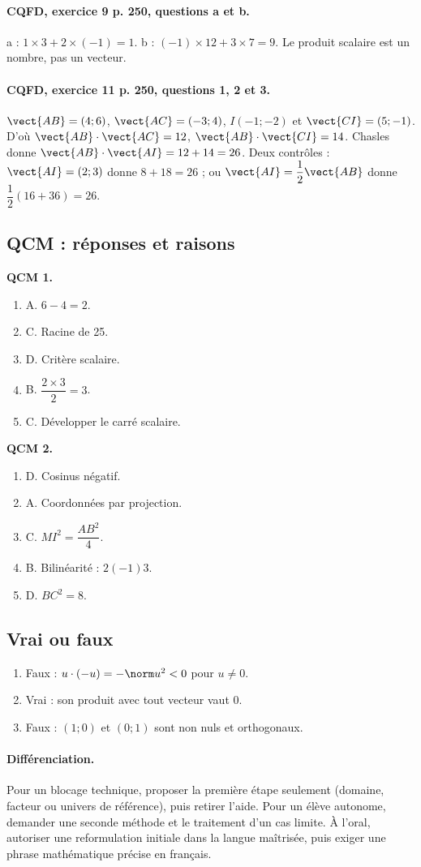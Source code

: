 \paragraph{CQFD, exercice 9 p. 250, questions a et b.} a : $1\times3+2\times(-1)=1$. b : $(-1)\times12+3\times7=9$. Le produit scalaire est un nombre, pas un vecteur.
\paragraph{CQFD, exercice 11 p. 250, questions 1, 2 et 3.} $\vect{AB}=(4;6)$, $\vect{AC}=(-3;4)$, $I(-1;-2)$ et $\vect{CI}=(5;-1)$. D’où $\vect{AB}\cdot\vect{AC}=12$, $\vect{AB}\cdot\vect{CI}=14$. Chasles donne $\vect{AB}\cdot\vect{AI}=12+14=26$. Deux contrôles : $\vect{AI}=(2;3)$ donne $8+18=26$ ; ou $\vect{AI}=\dfrac12\vect{AB}$ donne $\dfrac12(16+36)=26$.
\subsection*{QCM : réponses et raisons}
\textbf{QCM 1.}
\begin{enumerate}
\item A. $6-4=2$.
\item C. Racine de 25.
\item D. Critère scalaire.
\item B. $\dfrac{2\times 3}{2}=3$.
\item C. Développer le carré scalaire.
\end{enumerate}
\textbf{QCM 2.}
\begin{enumerate}
\item D. Cosinus négatif.
\item A. Coordonnées par projection.
\item C. $MI^2=\dfrac{AB^2}{4}$.
\item B. Bilinéarité : $2(-1)3$.
\item D. $BC^2=8$.
\end{enumerate}
\subsection*{Vrai ou faux}
\begin{enumerate}
\item Faux : $u\cdot(-u)=-\norm u^2<0$ pour $u\ne0$.
\item Vrai : son produit avec tout vecteur vaut 0.
\item Faux : $(1;0)$ et $(0;1)$ sont non nuls et orthogonaux.
\end{enumerate}
\paragraph{Différenciation.} Pour un blocage technique, proposer la première étape seulement (domaine, facteur ou univers de référence), puis retirer l’aide. Pour un élève autonome, demander une seconde méthode et le traitement d’un cas limite. À l’oral, autoriser une reformulation initiale dans la langue maîtrisée, puis exiger une phrase mathématique précise en français.
